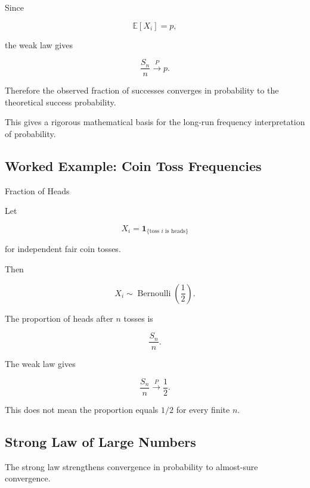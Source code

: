 Since

\[
\mathbb{E}[X_i]=p,
\]

the weak law gives

\[
\boxed{
\frac{S_n}{n}
\xrightarrow{P}
p.
}
\]

Therefore the observed fraction of successes converges in probability to
the theoretical success probability.

This gives a rigorous mathematical basis for the long-run frequency
interpretation of probability.

\subsection{Worked Example: Coin Toss Frequencies}
\label{subsec:worked-coin-frequency}

\begin{workedexamplebox}{Fraction of Heads}

Let

\[
X_i
=
\mathbf{1}_{\{\text{toss \(i\) is heads}\}}
\]

for independent fair coin tosses.

Then

\[
X_i\sim\operatorname{Bernoulli}\left(\frac12\right).
\]

The proportion of heads after \(n\) tosses is

\[
\frac{S_n}{n}.
\]

The weak law gives

\begin{answerbox}
\[
\boxed{
\frac{S_n}{n}
\xrightarrow{P}
\frac12.
}
\]
\end{answerbox}

This does not mean the proportion equals \(1/2\) for every finite \(n\).

\end{workedexamplebox}

\subsection{Strong Law of Large Numbers}
\label{subsec:strong-law-large-numbers}

The strong law strengthens convergence in probability to almost-sure
convergence.

